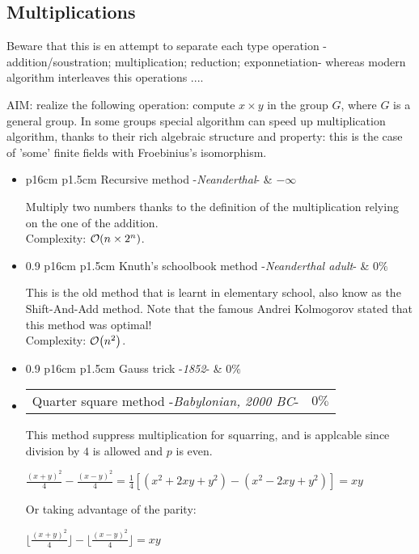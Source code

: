 \subsection{Multiplications}
\label{RSA_multipliction}

Beware that this is en attempt to separate each type operation -addition/soustration; multiplication; reduction; exponnetiation- whereas modern algorithm interleaves this operations ....

AIM: realize the following operation: compute $x \times y$ in the group $G$,
where $G$ is a general group. In some groups special algorithm can speed up 
multiplication algorithm, thanks to their rich algebraic structure and property:
this is the case of 'some' finite fields with Froebinius's isomorphism. 

\begin{itemize}
	\item  
		\begin{tabular*}{\linewidth}{ p{16cm} p{1.5cm}}
			Recursive method -\textit{Neanderthal}-  & $ -\infty $  \\
		\end{tabular*}	
			\noindent
			Multiply two numbers thanks to the definition of the multiplication 
			relying on the one of the addition.\\
			Complexity: $\mathop{}\mathopen{}\mathcal{O}\mathopen{}\left(n\times2^n\right)$.
	\item  	
		\begin{tabularx}{0.9\linewidth}{ p{16cm} p{1.5cm}}
			Knuth's schoolbook method -\textit{Neanderthal adult}-  & $0\%$ \\
		\end{tabularx}	
			\noindent
			This is the old method that is learnt in elementary school, also know as the Shift-And-Add method.
			Note that the famous Andrei Kolmogorov stated that this method was optimal! \\
			Complexity:  $\mathop{}\mathopen{}\mathcal{O}\mathopen{}\left(n^2\right)$.		

	\item 
		\begin{tabularx}{0.9\linewidth}{ p{16cm} p{1.5cm}}
			Gauss trick -\textit{1852}-  & $0\%$ 
		\end{tabularx}	

	\item  	\begin{tabularx}{\linewidth}{ p{16cm} p{1.5cm}}
			Quarter square method -\textit{Babylonian, 2000 BC}-  & $0\%$ \\ 
			\end{tabularx}	
			This method suppress multiplication for squarring, and is applcable since
			division by $4$ is allowed and $p$ is even.
			\noindent
			\begin{center}
			$			  \frac{(x+y)^2}{4} -  \frac{(x-y)^2}{4} =   \frac{1}{4}[(x^2+2xy+y^2)-(x^2-2xy+y^2)]= xy $
			\end{center}
			Or taking advantage of the parity:
			\begin{center}
			$			\lfloor  \frac{(x+y)^2}{4} \rfloor - \lfloor \frac{(x-y)^2}{4} \rfloor = xy $
			\end{center}


\end{itemize}
